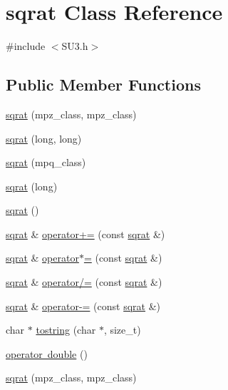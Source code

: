\hypertarget{classsqrat}{}\section{sqrat Class Reference}
\label{classsqrat}


{\ttfamily \#include $<$S\+U3.\+h$>$}

\subsection*{Public Member Functions}
\begin{DoxyCompactItemize}
\item 
\mbox{\hyperlink{classsqrat_a7c588af79fec6e3765efdd7475418a6a}{sqrat}} (mpz\+\_\+class, mpz\+\_\+class)
\item 
\mbox{\hyperlink{classsqrat_a37c42a6db5d602e438935e2a8396b960}{sqrat}} (long, long)
\item 
\mbox{\hyperlink{classsqrat_a9ae811495db9b4763bef65bbb4be6260}{sqrat}} (mpq\+\_\+class)
\item 
\mbox{\hyperlink{classsqrat_a5a582658adaae3fa6e4a2833c20b657d}{sqrat}} (long)
\item 
\mbox{\hyperlink{classsqrat_a133ea2fa104facfe3057277d096235d2}{sqrat}} ()
\item 
\mbox{\hyperlink{classsqrat}{sqrat}} \& \mbox{\hyperlink{classsqrat_a6b114d2daa3204ec91671ad701f177c0}{operator+=}} (const \mbox{\hyperlink{classsqrat}{sqrat}} \&)
\item 
\mbox{\hyperlink{classsqrat}{sqrat}} \& \mbox{\hyperlink{classsqrat_a6be4d90a04d40dcdbbb0021e63893718}{operator$\ast$=}} (const \mbox{\hyperlink{classsqrat}{sqrat}} \&)
\item 
\mbox{\hyperlink{classsqrat}{sqrat}} \& \mbox{\hyperlink{classsqrat_a7c53e1f92b41f58404701af587d4e71a}{operator/=}} (const \mbox{\hyperlink{classsqrat}{sqrat}} \&)
\item 
\mbox{\hyperlink{classsqrat}{sqrat}} \& \mbox{\hyperlink{classsqrat_a1febaf3ebc9433b43d17f14e74f2057f}{operator-\/=}} (const \mbox{\hyperlink{classsqrat}{sqrat}} \&)
\item 
char $\ast$ \mbox{\hyperlink{classsqrat_a001bc36694a9213a62c22c8d8bebbec2}{tostring}} (char $\ast$, size\+\_\+t)
\item 
\mbox{\hyperlink{classsqrat_af1d90ee59e36a87aa7a94dacdab875de}{operator double}} ()
\item 
\mbox{\hyperlink{classsqrat_a7c588af79fec6e3765efdd7475418a6a}{sqrat}} (mpz\+\_\+class, mpz\+\_\+class)

\end{DoxyCompactItemize}
